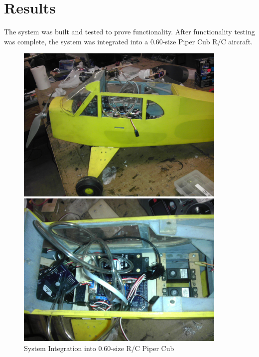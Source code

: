 \chapter{Results}
\label{results}
The system was built and tested to prove functionality. After functionality testing was complete, the system was integrated into a 0.60-size Piper Cub R/C aircraft.

\begin{figure}[H]
\label{sysIntPics}
\begin{center}
\begin{minipage}[b]{0.45\linewidth}
  \centering
    \includegraphics[width=0.9\textwidth]{figures/sysInt1.jpg}
\end{minipage}
\begin{minipage}[b]{0.45\linewidth}
  \centering
    \includegraphics[width=0.9\textwidth]{figures/sysInt2.jpg}
\end{minipage}
\end{center}
\caption{System Integration into 0.60-size R/C Piper Cub}
\end{figure}

